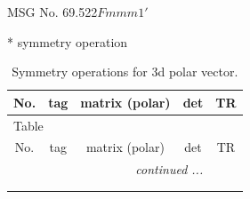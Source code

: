 \documentclass[fleqn,8pt]{jsarticle}
\begin{document}
\setcounter{MaxMatrixCols}{32}

\renewcommand{\tablename}{Table~}
\renewcommand{\figurename}{Figure~}
\begin{center}
\LARGE
MSG No. 69.522\quad$Fmmm1'$
\end{center}
* symmetry operation
\renewcommand{\arraystretch}{1.3}
\begin{longtable}{ccccc}
\caption{Symmetry operations for 3d polar vector.}
 \\
 \hline \hline
No. & tag & matrix (polar) & det & TR \\ \hline \endfirsthead

\multicolumn{4}{l}{\tablename\ \thetable{}} \\
 \hline \hline
No. & tag & matrix (polar) & det & TR \\ \hline \endhead

 \hline \hline
\multicolumn{4}{r}{\footnotesize\it continued ...} \\ \endfoot

 \hline \hline
\multicolumn{4}{r}{} \\ \endlastfoot


\end{longtable}
\end{document}
